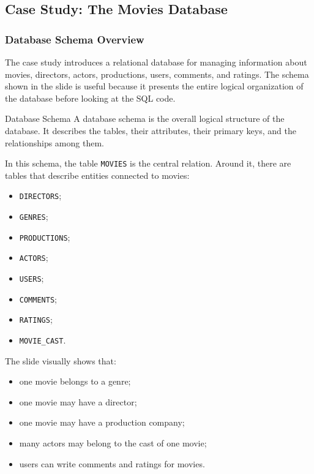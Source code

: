  \subsection{Case Study: The Movies Database}

 \subsubsection{Database Schema Overview}

 The case study introduces a relational database for managing information about movies, directors, actors, productions, users, comments, and ratings. The schema shown in the slide is useful because it presents the entire logical organization of the database before looking at the SQL code.

 \begin{defbox}{Database Schema}
  A database schema is the overall logical structure of the database. It describes the tables, their attributes, their primary keys, and the relationships among them.
 \end{defbox}

 In this schema, the table \texttt{MOVIES} is the central relation. Around it, there are tables that describe entities connected to movies:
 \begin{itemize}
  \item \texttt{DIRECTORS};
  \item \texttt{GENRES};
  \item \texttt{PRODUCTIONS};
  \item \texttt{ACTORS};
  \item \texttt{USERS};
  \item \texttt{COMMENTS};
  \item \texttt{RATINGS};
  \item \texttt{MOVIE\_CAST}.
 \end{itemize}

 The slide visually shows that:
 \begin{itemize}
  \item one movie belongs to a genre;
  \item one movie may have a director;
  \item one movie may have a production company;
  \item many actors may belong to the cast of one movie;
  \item users can write comments and ratings for movies.
 \end{itemize}

